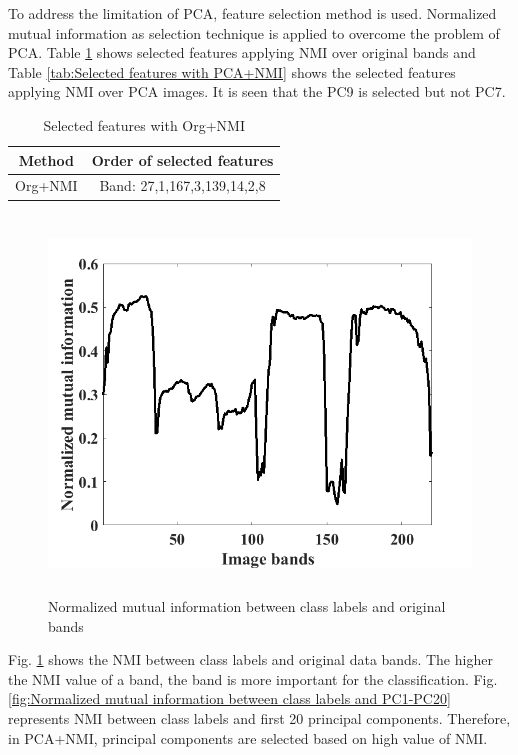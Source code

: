 \documentclass[document.tex]{subfiles}
\begin{document}
To address the limitation of PCA, feature selection method is used. Normalized mutual information as selection technique is applied to overcome the problem of PCA. Table \ref{tab:Selected features with Org+NMI} shows selected features applying NMI over original bands and Table \ref{tab:Selected features with PCA+NMI} shows the selected features applying NMI over PCA images. It is seen that the PC9 is selected but not PC7. 
\begin{table}[H]
	\caption{Selected features with Org+NMI}
	\begin{center}
		\begin{tabular}{|c|c|}
			\hline
			Method & Order of selected features\\ \hline
			Org+NMI & Band: 27,1,167,3,139,14,2,8\\ \hline
		\end{tabular}
	\end{center}
	\label{tab:Selected features with Org+NMI}
\end{table}
\begin{figure}[H]
	\begin{center}
		\includegraphics[height=10.0cm]{imgs/OrgNmi.png}
	\end{center}
	\caption{Normalized mutual information between class labels and original bands}
	\label{fig:Normalized mutual information between class labels and original bands}
\end{figure}

\noindent Fig. \ref{fig:Normalized mutual information between class labels and original bands} shows the NMI between class labels and original data bands. The higher the NMI value of a band, the band is more important for the classification. Fig. \ref{fig:Normalized mutual information between class labels and PC1-PC20} represents NMI between class labels and first 20 principal components. Therefore, in PCA+NMI, principal components are selected based on high value of NMI. 
\end{document}
